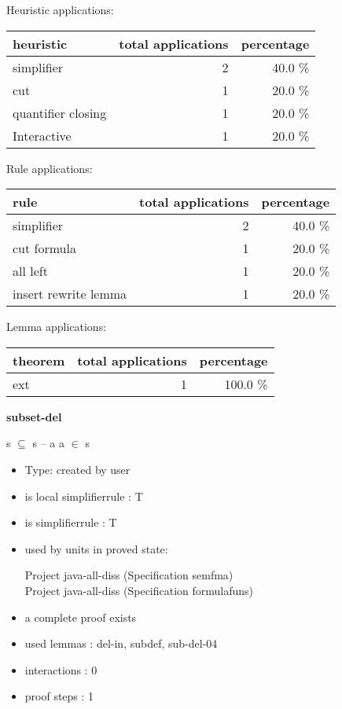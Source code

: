 \documentclass[a4paper]{article}
\begin{document}
\medskip


Heuristic applications:

\begin{supertabular}{l|r|r}
heuristic	& total applications & percentage \\ \hline
simplifier & 2 & 40.0 \% \\
cut & 1 & 20.0 \% \\
quantifier closing & 1 & 20.0 \% \\
Interactive & 1 & 20.0 \% \\

\end{supertabular}

Rule applications:

\begin{supertabular}{l|r|r}
rule	        & total applications & percentage \\ \hline
simplifier & 2 & 40.0 \% \\
cut formula & 1 & 20.0 \% \\
all left & 1 & 20.0 \% \\
insert rewrite lemma & 1 & 20.0 \% \\

\end{supertabular}

Lemma applications:

\begin{supertabular}{l|r|r}
theorem	        & total applications & percentage \\ \hline
ext & 1 & 100.0 \% \\

\end{supertabular}
\pagebreak

{\LARGE\bf subset-del}\label{lemma-subset-del}

\medskip

 \Fol s $\subseteq$ s -- a \Equiv \Not a $\in$ s

\begin{itemize}

\item Type: created by user

\item is local simplifierrule : T
\item is simplifierrule : T
\item used by units in proved state:

Project java-all-diss (Specification semfma) \\
Project java-all-diss (Specification formulafuns)
\item       a complete proof exists
\item       used lemmas  : del-in, subdef, sub-del-04
\item       interactions : 0
\item       proof steps  : 1
\end{itemize}
\end{document}
